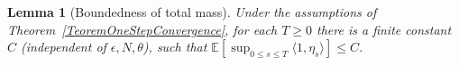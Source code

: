 \documentclass[12pt]{article}
\newenvironment {proof}{{\noindent\bf Proof }}{\hfill $\Box$ \medskip}
\newtheorem{lemma}[theorem]{Lemma}
\newcommand{\IE}{\mathbb E}
\newcommand{\comment}[1]{{\color{blue} \it #1}}
\begin{document}
\begin{lemma}[Boundedness of total mass] \label{Lemma:UniformlyBoundedMass}
    Under the assumptions of Theorem~\ref{TeoremOneStepConvergence},
    for each $T \ge 0$ there is a finite constant $C$ (independent of $\epsilon, N, \theta$),
    such that $\IE\left[ \sup_{0 \leq s \leq T} \langle 1, \eta_s \rangle \right] \leq C$.
\end{lemma}

% 
% 
\end{document}

